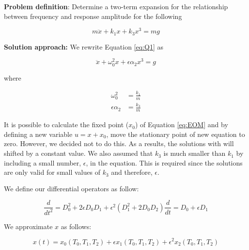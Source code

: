 \textbf{Problem definition}:
Determine a two-term expansion for the relationship between frequency and response amplitude for the following

%
\begin{equation}\label{eq:Q1}
	m \ddot{x} + k_1 x + k_3 x^3 = mg
\end{equation}
%

\noindent\hrulefill

\textbf{Solution approach:}
We rewrite Equation \eqref{eq:Q1} as

%
\begin{equation}\label{eq:EOM}
	\ddot{x} + \omega_0^2 x + \epsilon \alpha_2 x^3 = g
\end{equation}
%

where

%
\begin{align*}
	\omega_0^2 &= \frac{k_1}{m} \\
	\epsilon \alpha_2 &= \frac{k_3}{m}
\end{align*}
%

It is possible to calculate the fixed point ($x_0$) of Equation \eqref{eq:EOM}  and by defining a new variable $u = x + x_0$, move the stationary point of new equation to zero. However, we decided not to do this. As a results, the solutions with will shifted by a constant value. We also assumed that $k_3$ is much smaller than $k_1$ by including a small number, $\epsilon$, in the equation. This is required since the solutions are only valid for small values of $k_3$ and therefore, $\epsilon$.

We define our differential operators as follow:

%
\begin{subequations}\label{eq:operators}
\begin{equation}
	\frac{d}{dt^2} = D_0^2 + 2 \epsilon D_0 D_1 + \epsilon^2 					\left(D_1^2 + 2 D_0 D_2\right)
\end{equation}
\begin{equation}
	\frac{d}{dt} = D_0 + \epsilon D_1
\end{equation}
\end{subequations}
%

We approximate $x$ as follows:

%
\begin{equation}\label{eq:xApprox}
	x(t) = x_0 (T_0, T_1, T_2) + 
	       \epsilon x_1 (T_0, T_1, T_2) +
	       \epsilon^2 x_2 (T_0, T_1, T_2)
\end{equation}
%

